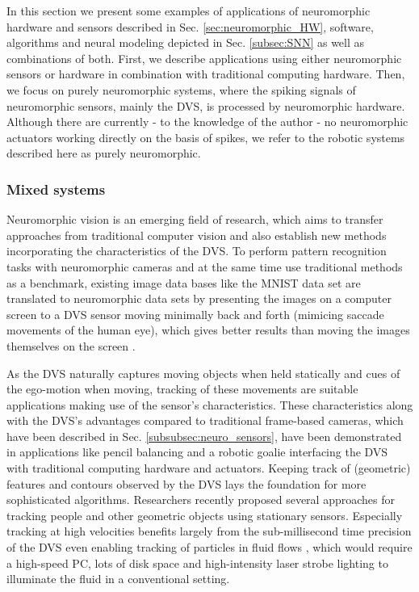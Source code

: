 In this section we present some examples of applications of neuromorphic hardware and sensors described in Sec. \ref{sec:neuromorphic_HW}, software, algorithms and neural modeling depicted in Sec. \ref{subsec:SNN} as well as combinations of both.
First, we describe applications using either neuromorphic sensors or hardware in combination with traditional computing hardware.
Then, we focus on purely neuromorphic systems, where the spiking signals of neuromorphic sensors, mainly the \ac{DVS}, is processed by neuromorphic hardware.
Although there are currently - to the knowledge of the author - no neuromorphic actuators working directly on the basis of spikes, we refer to the robotic systems described here as purely neuromorphic.


\subsubsection{Mixed systems}
\label{subsubsec:mixed_sys}

Neuromorphic vision \cite{Tan2015} is an emerging field of research, which aims to transfer approaches from traditional computer vision and also establish new methods incorporating the characteristics of the \ac{DVS}.
To perform pattern recognition tasks with neuromorphic cameras and at the same time use traditional methods as a benchmark, existing image data bases like the \ac{MNIST} data set \cite{LeCun1998} are translated to neuromorphic data sets by presenting the images on a computer screen to a \ac{DVS} sensor moving minimally back and forth \cite{Orchard2015} (mimicing saccade movements of the human eye), which gives better results than moving the images themselves on the screen \cite{Serrano-Gotarredona2013}.

As the \ac{DVS} naturally captures moving objects when held statically and cues of the ego-motion when moving, tracking of these movements are suitable applications making use of the sensor's characteristics.
These characteristics along with the \ac{DVS}'s advantages compared to traditional frame-based cameras, which have been described in Sec. \ref{subsubsec:neuro_sensors}, have been demonstrated in applications like pencil balancing \cite{Conradt2009} and a robotic goalie \cite{Delbruck2013} interfacing the \ac{DVS} with traditional computing hardware and actuators.
Keeping track of (geometric) features \cite{Lagorce2015} and contours \cite{Barranco2014} observed by the \ac{DVS} lays the foundation for more sophisticated algorithms.
Researchers recently proposed several approaches for tracking people \cite{Schraml2010, Piatkowska2012} and other geometric objects \cite{ReverterValeiras2016} using stationary sensors.
Especially tracking at high velocities \cite{Saner2014} benefits largely from the sub-millisecond time precision of the \ac{DVS} even enabling tracking of particles in fluid flows \cite{Drazen2011}, which would require a high-speed PC, lots of disk space and high-intensity laser strobe lighting to illuminate the fluid in a conventional setting.

